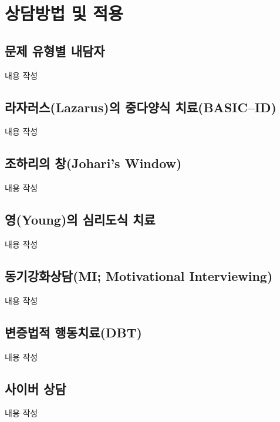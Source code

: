 \section{상담방법 및 적용}

\subsection{문제 유형별 내담자}
내용 작성

\subsection{라자러스(Lazarus)의 중다양식 치료(BASIC–ID)}
내용 작성

\subsection{조하리의 창(Johari's Window)}
내용 작성

\subsection{영(Young)의 심리도식 치료}
내용 작성

\subsection{동기강화상담(MI; Motivational Interviewing)}
내용 작성

\subsection{변증법적 행동치료(DBT)}
내용 작성

\subsection{사이버 상담}
내용 작성
